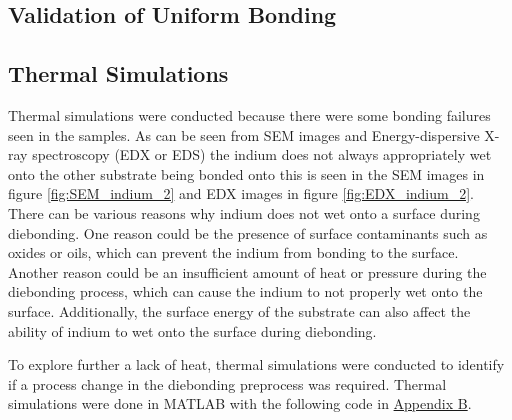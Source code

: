 \newpage
\subsection{Validation of Uniform Bonding}
\label{sec:uniformBond}

\newpage
\subsection{Thermal Simulations}

Thermal simulations were conducted because there were some bonding failures seen in the samples. As can be seen from SEM images and Energy-dispersive X-ray spectroscopy (EDX or EDS) the indium does not always appropriately wet onto the other substrate being bonded onto this is seen in the SEM images in figure
\ref{fig:SEM_indium_2} and EDX images in figure \ref{fig:EDX_indium_2}.
There can be various reasons why indium does not wet onto a surface during diebonding. One reason could be the presence of surface contaminants such as oxides or oils, which can prevent the indium from bonding to the surface. Another reason could be an insufficient amount of heat or pressure during the diebonding process, which can cause the indium to not properly wet onto the surface. Additionally, the surface energy of the substrate can also affect the ability of indium to wet onto the surface during diebonding.

To explore further a lack of heat, thermal simulations were conducted to identify if a process change in the diebonding preprocess was required. Thermal simulations were done in MATLAB with the following code in
\hyperref[sec:ThermalSimulationCode]{Appendix B}.


